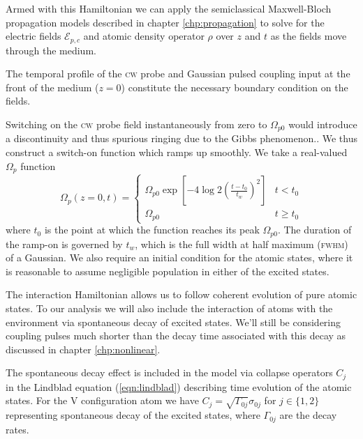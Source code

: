     Armed with this Hamiltonian we can apply the semiclassical Maxwell-Bloch
    propagation models described in chapter \ref{chp:propagation} to solve for
    the electric fields $\mathcal{E}_{p,c}$ and atomic density operator $\rho$
    over $z$ and $t$ as the fields move through the medium.

    The temporal profile of the \textsc{cw} probe and Gaussian pulsed
    coupling input at the front of the medium ($z\!=\!0$) constitute the
    necessary boundary condition on the fields.

    Switching on the \textsc{cw} probe field instantaneously from zero to
    $\Omega_{p0}$ would introduce a discontinuity and thus spurious ringing due
    to the Gibbs phenomenon.\cite{Hewitt1979}. We thus construct a switch-on
    function which ramps up smoothly. We take a real-valued $\Omega_{p}$
    function
    \begin{equation}
      \Omega_p(z\!=\!0, t) = 
      \begin{cases}
        \Omega_{p0} \exp \left[ -4 \log 2 \left( \frac{t - t_0}{t_w}
        \right)^2 \right] & t < t_0\\
        \Omega_{p0} & t \ge t_0
      \end{cases}
      \label{eqn:rampup}
    \end{equation}
    where $t_0$ is the point at which the function reaches its peak
    $\Omega_{p0}$. The duration of the ramp-on is governed by $t_w$, which is
    the full width at half maximum (\textsc{fwhm}) of a Gaussian. We also
    require an initial condition for the atomic states, where it is reasonable
    to assume negligible population in either of the excited states.

    The interaction Hamiltonian allows us to follow coherent evolution of pure
    atomic states. To our analysis we will also include the interaction of atoms
    with  the environment via spontaneous decay of excited states. We'll still
    be considering coupling pulses much shorter than the decay time associated
    with  this decay as discussed in chapter \ref{chp:nonlinear}.

    The spontaneous decay effect is included in the model via collapse operators
    $C_j$ in the Lindblad equation (\ref{eqn:lindblad}) describing time evolution
    of the atomic states. For the V configuration atom we have $C_{j}  =
    \sqrt{\Gamma_{0j}}\sigma_{0j}$ for $j \in \{1, 2\}$ representing spontaneous
    decay of the excited states, where $\Gamma_{0j}$ are the decay rates.

